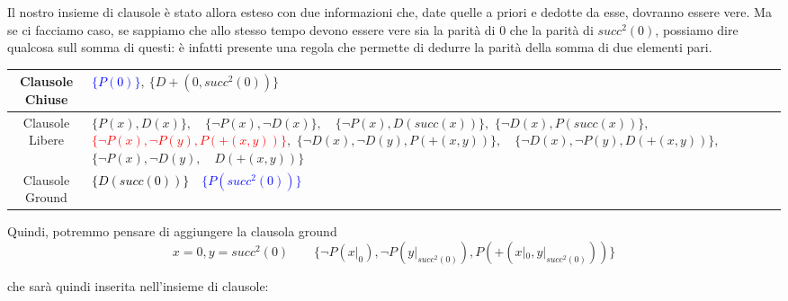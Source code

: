 \documentclass[a4paper,10pt]{article}
\begin{document}
Il nostro insieme di clausole è stato allora esteso con due informazioni che, date quelle a priori e dedotte da esse, dovranno essere vere. Ma se ci facciamo caso, se sappiamo che allo stesso tempo devono essere vere sia la parità di $0$ che la parità di $succ^2(0)$, possiamo dire qualcosa sull somma di questi: è infatti presente una regola che permette di dedurre la parità della somma di due elementi pari.

\begin{table}[h]
    \centering
    \small 
    \renewcommand{\arraystretch}{1.5} 
    
    \begin{tabularx}{\textwidth}{|c|>{\centering\arraybackslash}X|}
        \hline
        Clausole Chiuse & \textcolor{blue}{$\{P(0)\}$}$, \ \{D+(0,succ^2(0))\}$ \\
        \hline
        Clausole Libere & 
            $\{P(x), D(x)\},\quad \{\lnot P(x), \lnot D(x)\},\quad \{\lnot P(x), D(succ(x))\},$\newline
            $\{\lnot D(x), P(succ(x))\},\quad $\textcolor{red}{$\{\lnot P(x), \lnot P(y), P(+(x, y))\}$}$,$\newline
            $\{\lnot D(x), \lnot D(y), P(+(x, y))\},\quad \{\lnot D(x), \lnot P(y), D(+(x, y))\},$\newline
            $\{\lnot P(x), \lnot D(y),\quad D(+(x, y))\}$ 
            \\
        \hline
        Clausole Ground & \textcolor{black}{$\{D(succ(0))\}\quad$}\textcolor{blue}{$\{P(succ^2(0))\}\quad$} \\
        \hline
    \end{tabularx}
\end{table}

Quindi, potremmo pensare di aggiungere la clausola ground
$$x=0,y=succ^2(0)\quad\quad\{\lnot P(x|_0), \lnot P(y|_{succ^2(0)}), P(+(x|_0, y|_{succ^2(0)}))\}$$

che sarà quindi inserita nell'insieme di clausole:
\end{document}
